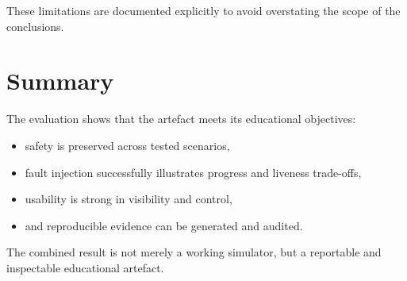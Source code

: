 These limitations are documented explicitly to avoid overstating the scope of the conclusions.

\section{Summary}
The evaluation shows that the artefact meets its educational objectives:
\begin{itemize}
  \item safety is preserved across tested scenarios,
  \item fault injection successfully illustrates progress and liveness trade-offs,
  \item usability is strong in visibility and control,
  \item and reproducible evidence can be generated and audited.
\end{itemize}

The combined result is not merely a working simulator, but a reportable and inspectable educational artefact.